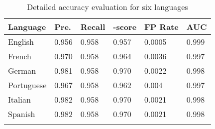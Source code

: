 \documentclass[10pt,conference,compsocconf,letterpaper]{IEEEtran}
\begin{document}
\begin{table}[th]
\caption{Detailed accuracy evaluation for six languages} \centering
	\begin{tabular}{l l l l l l }
	\textbf{Language}	& \textbf{Pre.} & \textbf{Recall}  & \textbf{-score}  &\textbf{FP Rate}  & \textbf{AUC} \\ \hline
English & 0.956 &	0.958 &		0.957 &		0.0005	 &	0.999 \\
French & 0.970 &	0.958 &		0.964 &		0.0036	 &	0.997 \\
German &  0.981 &	0.958 &		0.970 &		0.0022 &		0.998 \\
Portuguese &  0.967	 &	0.958	& 0.962 &		0.004	 &	0.997 \\
Italian &  0.982	 &	0.958	 &	0.970	 &	0.0021 &	0.998 \\
Spanish &  0.982	 &	0.958	 &	0.970	 &	0.0021	 &	0.998 \\
		\label{tbl:main-eval-table}
 \end{tabular}
\end{table}
\end{document}
